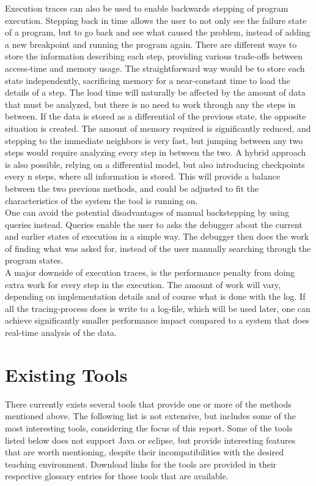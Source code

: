 Execution traces can also be used to enable backwards stepping of program execution.
Stepping back in time allows the user to not only see the failure state of a program, but to go back and see what caused the problem, instead of adding a new \gls{breakpoint} and running the program again.
There are different ways to store the information describing each step, providing various trade-offs between access-time and memory usage.
The straightforward way would be to store each state independently, sacrificing memory for a near-constant time to load the details of a step.
The load time will naturally be affected by the amount of data that must be analyzed, but there is no need to work through any the steps in between.
If the data is stored as a differential of the previous state, the opposite situation is created.
The amount of memory required is significantly reduced, and stepping to the immediate neighbors is very fast, but jumping between any two steps would require analyzing every step in between the two.
A hybrid approach is also possible, relying on a differential model, but also introducing checkpoints every n steps, where all information is stored.
This will provide a balance between the two previous methods, and could be adjusted to fit the characteristics of the system the tool is running on.
~\\

One can avoid the potential disadvantages of manual backstepping by using queries instead.
Queries enable the user to asks the debugger about the current and earlier states of execution in a simple way.
The debugger then does the work of finding what was asked for, instead of the user manually searching through the program states.
~\\

A major downside of execution traces, is the performance penalty from doing extra work for every step in the execution.
The amount of work will vary, depending on implementation details and of course what is done with the log.
If all the tracing-process does is write to a log-file, which will be used later, one can achieve significantly smaller performance impact compared to a system that does real-time analysis of the data.
~\\

\section{Existing Tools}\label{PreTools}%
There currently exists several tools that provide one or more of the methods mentioned above.
The following list is not extensive, but includes some of the most interesting tools, considering the focus of this report.
Some of the tools listed below does not support Java or eclipse, but provide interesting features that are worth mentioning, despite their incompatibilities with the desired teaching environment.
Download links for the tools are provided in their respective glossary entries for those tools that are available.
~\\

